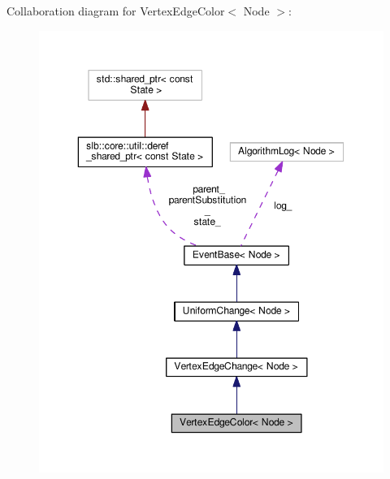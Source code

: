 Collaboration diagram for Vertex\+Edge\+Color$<$ Node $>$\+:\nopagebreak
\begin{figure}[H]
\begin{center}
\leavevmode
\includegraphics[width=350pt]{structVertexEdgeColor__coll__graph}
\end{center}
\end{figure}
